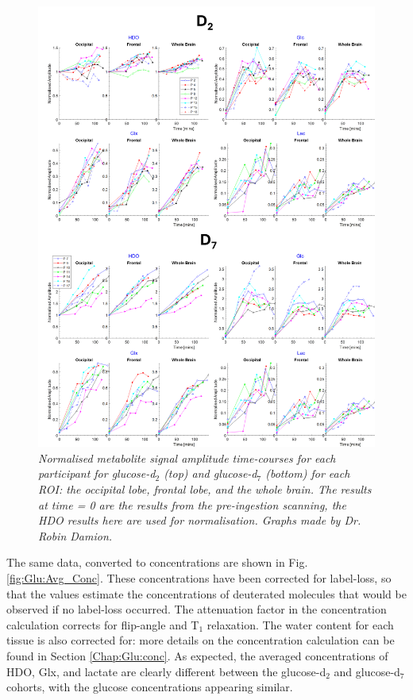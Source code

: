 \begin{figure}
    \centering
    \includegraphics[width = 1\textwidth]{Figures/Glucose/Ind_Amp.png}
    \caption{\textit{Normalised metabolite signal amplitude time-courses for each participant for glucose-d$_2$ (top) and glucose-d$_7$ (bottom) for each \ac{ROI}: the occipital lobe, frontal lobe, and the whole brain. The results at time = 0 are the results from the pre-ingestion scanning, the \ac{HDO} results here are used for normalisation. Graphs made by Dr. Robin Damion.}}
    \label{fig:Glu:Ind_Amp}
\end{figure}

The same data, converted to concentrations are shown in Fig. \ref{fig:Glu:Avg_Conc}. These concentrations have been corrected for label-loss, so that the values estimate the concentrations of deuterated molecules that would be observed if no label-loss occurred. The attenuation factor in the concentration calculation corrects for flip-angle and T$_1$ relaxation. The water content for each tissue is also corrected for: more details on the concentration calculation can be found in Section \ref{Chap:Glu:conc}. As expected, the averaged concentrations of \ac{HDO}, Glx, and lactate are clearly different between the glucose-d$_2$ and glucose-d$_7$ cohorts, with the glucose concentrations appearing similar. 

